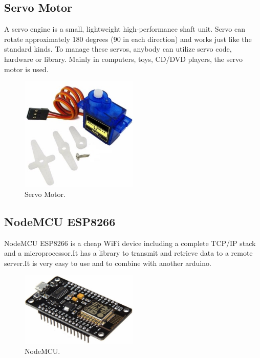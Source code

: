 \subsection{Servo Motor}
A servo engine is a small, lightweight high-performance shaft unit. Servo can rotate approximately 180 degrees (90 in each direction) and works just like the standard kinds. To manage these servos, anybody can utilize servo code, hardware or library. Mainly in computers, toys, CD/DVD players, the servo motor is used.
\begin{figure}[H]
\centering
\includegraphics[width=0.5\textwidth]{figures/Servo Motor.jpg}
\caption{Servo Motor.}
\label{Servo motor}
\end{figure}
\subsection{NodeMCU ESP8266}
NodeMCU ESP8266 is a cheap WiFi device including a complete TCP/IP stack and a microprocessor.It has a library to transmit and retrieve data to a remote server.It is very easy to use and to combine with another arduino.
\begin{figure}[H]
\centering
\includegraphics[width=0.5\textwidth]{figures/NodeMCU_ESP8266_development_board_1024x1024.jpg}
\caption{NodeMCU.}
\label{NodeMCU}
\end{figure}
